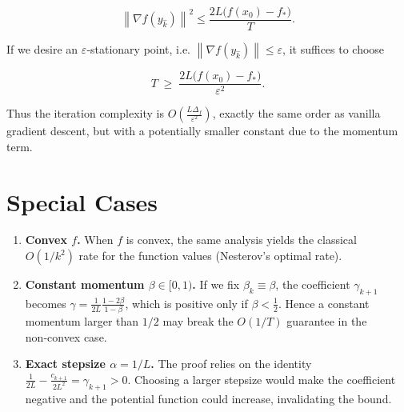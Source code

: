 \documentclass{article}
\newcommand{\norm}[1]{\left\lVert#1\right\rVert}
\newcommand{\grad}{\nabla}
\begin{document}
\[
\norm{\grad f(y_{\hat{k}})}^{2}
\le \frac{2L\bigl(f(x_{0})-f_*\bigr)}{T}.
\]

If we desire an $\varepsilon$‑stationary point, i.e.
$\norm{\grad f(y_{\hat{k}})}\le\varepsilon$, it suffices to choose  

\[
T\;\ge\; \frac{2L\bigl(f(x_{0})-f_*\bigr)}{\varepsilon^{2}} .
\]

Thus the iteration complexity is $O\!\left(\frac{L\Delta_f}{\varepsilon^{2}}\right)$,
exactly the same order as vanilla gradient descent, but with a
potentially smaller constant due to the momentum term.

\section*{Special Cases}
\begin{enumerate}[label={\arabic*.}, leftmargin=*]
\item \textbf{Convex $f$.}  When $f$ is convex, the same analysis yields the
classical $O(1/k^{2})$ rate for the function values (Nesterov’s optimal rate).
\item \textbf{Constant momentum $\beta\in[0,1)$.}  If we fix $\beta_k\equiv\beta$,
the coefficient $\gamma_{k+1}$ becomes
$\gamma = \frac{1}{2L}\frac{1-2\beta}{1-\beta}$,
which is positive only if $\beta<\tfrac12$.  Hence a constant momentum
larger than $1/2$ may break the $O(1/T)$ guarantee in the non‑convex case.
\item \textbf{Exact stepsize $\alpha=1/L$.}  The proof relies on the
identity $\frac{1}{2L}-\frac{c_{k+1}}{2L^{2}} = \gamma_{k+1}>0$.
Choosing a larger stepsize would make the coefficient negative and the
potential function could increase, invalidating the bound.
\end{enumerate}

\end{document}
